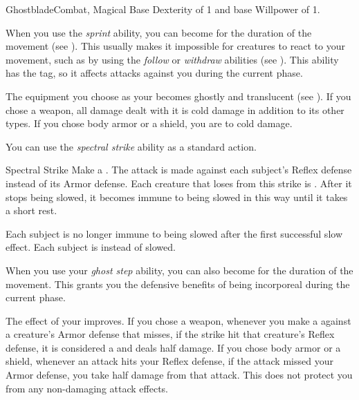     \begin{feat}{Ghostblade}{Combat, Magical}
        \featpre Base Dexterity of 1 and base Willpower of 1.

         When you use the \textit{sprint} ability, you can become  for the duration of the movement (see ).
        This usually makes it impossible for creatures to react to your movement, such as by using the \textit{follow} or \textit{withdraw} abilities (see ).
        This ability has the  tag, so it affects attacks against you during the current phase.

         The equipment you choose as your  becomes ghostly and translucent (see ).
        If you chose a weapon, all damage dealt with it is cold damage in addition to its other types.
        If you chose body armor or a shield, you are  to cold damage.

         You can use the \textit{spectral strike} ability as a standard action.
        \begin{durationability}{Spectral Strike}
            Make a .
            The attack is made against each subject's Reflex defense instead of its Armor defense.
            Each creature that loses  from this strike is  \slowed.
            After it stops being slowed, it becomes immune to being slowed in this way until it takes a short rest.

            \rankline
             Each subject is no longer immune to being slowed after the first successful slow effect.
             Each subject is \decelerated instead of slowed.
        \end{durationability}

         When you use your \textit{ghost step} ability, you can also become  for the duration of the movement.
        This grants you the defensive benefits of being incorporeal during the current phase.

         The effect of your  improves.
        If you chose a weapon, whenever you make a  against a creature's Armor defense that misses, if the strike hit that creature's Reflex defense, it is considered a  and deals half damage.
        If you chose body armor or a shield, whenever an attack hits your Reflex defense, if the attack missed your Armor defense, you take half damage from that attack.
        This does not protect you from any non-damaging attack effects.


\end{feat}
